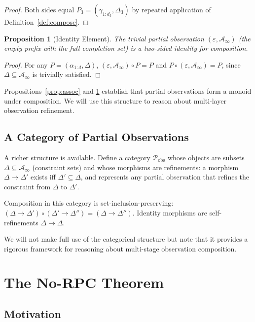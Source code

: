 \documentclass[11pt,a4paper]{article}
\newtheorem{proposition}[theorem]{Proposition}
\theoremstyle{definition}
\theoremstyle{remark}
\newcommand{\Pc}{\mathcal{P}}
\newcommand{\Ac}{\mathcal{A}}
\begin{document}
\begin{proof}
Both sides equal $P_3 = (\gamma_{1:d_3}, \Delta_3)$ by repeated application of Definition~\ref{def:compose}.
\end{proof}

\begin{proposition}[Identity Element]
\label{prop:identity-el}
The trivial partial observation $(\varepsilon, \Ac_\infty)$ (the empty prefix with the full completion set) is a two-sided identity for composition.
\end{proposition}

\begin{proof}
For any $P = (\alpha_{1:d}, \Delta)$, $(\varepsilon, \Ac_\infty) \circ P = P$ and $P \circ (\varepsilon, \Ac_\infty) = P$, since $\Delta \subseteq \Ac_\infty$ is trivially satisfied.
\end{proof}

Propositions~\ref{prop:assoc} and \ref{prop:identity-el} establish that partial observations form a monoid under composition. We will use this structure to reason about multi-layer observation refinement.

\subsection{A Category of Partial Observations}

A richer structure is available. Define a category $\Pc_{\text{obs}}$ whose objects are subsets $\Delta \subseteq \Ac_\infty$ (constraint sets) and whose morphisms are refinements: a morphism $\Delta \to \Delta'$ exists iff $\Delta' \subseteq \Delta$, and represents any partial observation that refines the constraint from $\Delta$ to $\Delta'$.

Composition in this category is set-inclusion-preserving: $(\Delta \to \Delta') \circ (\Delta' \to \Delta'') = (\Delta \to \Delta'')$. Identity morphisms are self-refinements $\Delta \to \Delta$.

We will not make full use of the categorical structure but note that it provides a rigorous framework for reasoning about multi-stage observation composition.

\section{The No-RPC Theorem}
\label{sec:norpc}

\subsection{Motivation}
\end{document}
